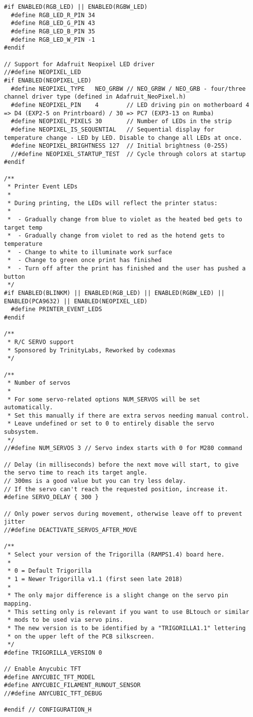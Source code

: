 \begin{lstlisting}
#if ENABLED(RGB_LED) || ENABLED(RGBW_LED)
  #define RGB_LED_R_PIN 34
  #define RGB_LED_G_PIN 43
  #define RGB_LED_B_PIN 35
  #define RGB_LED_W_PIN -1
#endif

// Support for Adafruit Neopixel LED driver
//#define NEOPIXEL_LED
#if ENABLED(NEOPIXEL_LED)
  #define NEOPIXEL_TYPE   NEO_GRBW // NEO_GRBW / NEO_GRB - four/three channel driver type (defined in Adafruit_NeoPixel.h)
  #define NEOPIXEL_PIN    4        // LED driving pin on motherboard 4 => D4 (EXP2-5 on Printrboard) / 30 => PC7 (EXP3-13 on Rumba)
  #define NEOPIXEL_PIXELS 30       // Number of LEDs in the strip
  #define NEOPIXEL_IS_SEQUENTIAL   // Sequential display for temperature change - LED by LED. Disable to change all LEDs at once.
  #define NEOPIXEL_BRIGHTNESS 127  // Initial brightness (0-255)
  //#define NEOPIXEL_STARTUP_TEST  // Cycle through colors at startup
#endif

/**
 * Printer Event LEDs
 *
 * During printing, the LEDs will reflect the printer status:
 *
 *  - Gradually change from blue to violet as the heated bed gets to target temp
 *  - Gradually change from violet to red as the hotend gets to temperature
 *  - Change to white to illuminate work surface
 *  - Change to green once print has finished
 *  - Turn off after the print has finished and the user has pushed a button
 */
#if ENABLED(BLINKM) || ENABLED(RGB_LED) || ENABLED(RGBW_LED) || ENABLED(PCA9632) || ENABLED(NEOPIXEL_LED)
  #define PRINTER_EVENT_LEDS
#endif

/**
 * R/C SERVO support
 * Sponsored by TrinityLabs, Reworked by codexmas
 */

/**
 * Number of servos
 *
 * For some servo-related options NUM_SERVOS will be set automatically.
 * Set this manually if there are extra servos needing manual control.
 * Leave undefined or set to 0 to entirely disable the servo subsystem.
 */
//#define NUM_SERVOS 3 // Servo index starts with 0 for M280 command

// Delay (in milliseconds) before the next move will start, to give the servo time to reach its target angle.
// 300ms is a good value but you can try less delay.
// If the servo can't reach the requested position, increase it.
#define SERVO_DELAY { 300 }

// Only power servos during movement, otherwise leave off to prevent jitter
//#define DEACTIVATE_SERVOS_AFTER_MOVE

/**
 * Select your version of the Trigorilla (RAMPS1.4) board here.
 *
 * 0 = Default Trigorilla
 * 1 = Newer Trigorilla v1.1 (first seen late 2018)
 *
 * The only major difference is a slight change on the servo pin mapping.
 * This setting only is relevant if you want to use BLtouch or similar
 * mods to be used via servo pins.
 * The new version is to be identified by a "TRIGORILLA1.1" lettering
 * on the upper left of the PCB silkscreen.
 */
#define TRIGORILLA_VERSION 0

// Enable Anycubic TFT
#define ANYCUBIC_TFT_MODEL
#define ANYCUBIC_FILAMENT_RUNOUT_SENSOR
//#define ANYCUBIC_TFT_DEBUG

#endif // CONFIGURATION_H

 \end{lstlisting}


